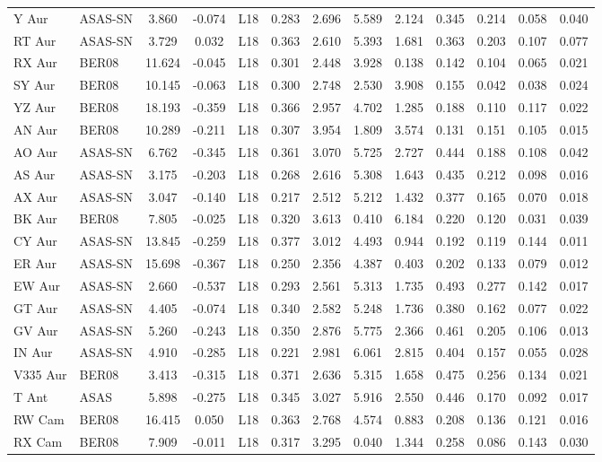 \documentclass[article]{aa} %
\begin{document}
\begin{appendix}
\begin{longtable}{llSSccccccccc}
Y Aur & ASAS-SN& 3.860 & -0.074&L18& 0.283&2.696&5.589 & 2.124 & 0.345 & 0.214 & 0.058&0.040\\
RT Aur & ASAS-SN& 3.729 & 0.032&L18& 0.363&2.610&5.393 & 1.681 & 0.363 & 0.203 & 0.107&0.077\\
RX Aur & BER08 & 11.624 & -0.045&L18& 0.301&2.448&3.928 & 0.138 & 0.142 & 0.104 & 0.065&0.021\\
SY Aur & BER08 & 10.145 & -0.063&L18& 0.300&2.748&2.530 & 3.908 & 0.155 & 0.042 & 0.038&0.024\\
YZ Aur & BER08 & 18.193 & -0.359&L18& 0.366&2.957&4.702 & 1.285 & 0.188 & 0.110 & 0.117&0.022\\
AN Aur & BER08 & 10.289 & -0.211&L18& 0.307&3.954&1.809 & 3.574 & 0.131 & 0.151 & 0.105&0.015\\
AO Aur & ASAS-SN& 6.762 & -0.345&L18& 0.361&3.070&5.725 & 2.727 & 0.444 & 0.188 & 0.108&0.042\\
AS Aur & ASAS-SN& 3.175 & -0.203&L18& 0.268&2.616&5.308 & 1.643 & 0.435 & 0.212 & 0.098&0.016\\
AX Aur & ASAS-SN& 3.047 & -0.140&L18& 0.217&2.512&5.212 & 1.432 & 0.377 & 0.165 & 0.070&0.018\\
BK Aur & BER08 & 7.805 & -0.025&L18& 0.320&3.613&0.410 & 6.184 & 0.220 & 0.120 & 0.031&0.039\\
CY Aur & ASAS-SN& 13.845 & -0.259&L18& 0.377&3.012&4.493 & 0.944 & 0.192 & 0.119 & 0.144&0.011\\
ER Aur & ASAS-SN& 15.698 & -0.367&L18& 0.250&2.356&4.387 & 0.403 & 0.202 & 0.133 & 0.079&0.012\\
EW Aur & ASAS-SN& 2.660 & -0.537&L18& 0.293&2.561&5.313 & 1.735 & 0.493 & 0.277 & 0.142&0.017\\
GT Aur & ASAS-SN& 4.405 & -0.074&L18& 0.340&2.582&5.248 & 1.736 & 0.380 & 0.162 & 0.077&0.022\\
GV Aur & ASAS-SN& 5.260 & -0.243&L18& 0.350&2.876&5.775 & 2.366 & 0.461 & 0.205 & 0.106&0.013\\
IN Aur & ASAS-SN& 4.910 & -0.285&L18& 0.221&2.981&6.061 & 2.815 & 0.404 & 0.157 & 0.055&0.028\\
V335 Aur & BER08 & 3.413 & -0.315&L18& 0.371&2.636&5.315 & 1.658 & 0.475 & 0.256 & 0.134&0.021\\
T Ant & ASAS & 5.898 & -0.275&L18& 0.345&3.027&5.916 & 2.550 & 0.446 & 0.170 & 0.092&0.017\\
RW Cam & BER08 & 16.415 & 0.050&L18& 0.363&2.768&4.574 & 0.883 & 0.208 & 0.136 & 0.121&0.016\\
RX Cam & BER08 & 7.909 & -0.011&L18& 0.317&3.295&0.040 & 1.344 & 0.258 & 0.086 & 0.143&0.030\\

\end{longtable}
\end{appendix}
\end{document}

